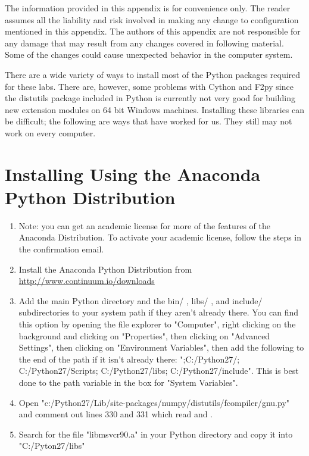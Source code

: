 \label{win64install}


\begin{warn}
The information provided in this appendix is for convenience only.
The reader assumes all the liability and risk involved in making any change to configuration mentioned in this appendix.
The authors of this appendix are not responsible for any damage that may result from any changes covered in following material.
Some of the changes could cause unexpected behavior in the computer system.
\end{warn}

There are a wide variety of ways to install most of the Python packages required for these labs.
There are, however, some problems with Cython and F2py since the distutils package included in Python is currently not very good for building new extension modules on 64 bit Windows machines.
Installing these libraries can be difficult; the following are ways that have worked for us.
They still may not work on every computer.

\section*{Installing Using the Anaconda Python Distribution}
\begin{enumerate}
\item Note: you can get an academic license for more of the features of the Anaconda Distribution.
To activate your academic license, follow the steps in the confirmation email.

\item Install the Anaconda Python Distribution from \url{http://www.continuum.io/downloads}

\item Add the main Python directory and the bin/ , libs/ , and include/ subdirectories to your system path if they aren't already there.
You can find this option by opening the file explorer to "Computer", right clicking on the background and clicking on "Properties", then clicking on "Advanced Settings", then clicking on "Environment Variables", then add the following to the end of the path if it isn't already there: ";C:/Python27/; C:/Python27/Scripts; C:/Python27/libs; C:/Python27/include". This is best done to the path variable in the box for "System Variables".

\item Open "c:/Python27/Lib/site-packages/numpy/distutils/fcompiler/gnu.py" and comment out lines 330 and 331 which read  and .

\item Search for the file "libmsvcr90.a" in your Python directory and copy it into "C:/Pyton27/libs"

\end{enumerate}


